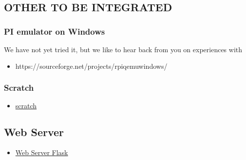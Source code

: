 \subsection{OTHER TO BE INTEGRATED}\label{other-to-be-integrated}

\subsubsection{PI emulator on Windows}\label{pi-emulator-on-windows}

We have not yet tried it, but we like to hear back from you on
experiences with

\begin{itemize}
\tightlist
\item
  https://sourceforge.net/projects/rpiqemuwindows/
\end{itemize}

\subsubsection{Scratch}\label{scratch}

\begin{itemize}
\tightlist
\item
  \href{https://github.com/DexterInd/GrovePi/tree/master/Software/Scratch}{scratch}
\end{itemize}

\subsection{Web Server}\label{web-server}

\begin{itemize}
\tightlist
\item
  \href{https://www.raspberrypi.org/learning/python-web-server-with-flask/worksheet/}{Web
  Server Flask}
\end{itemize}
